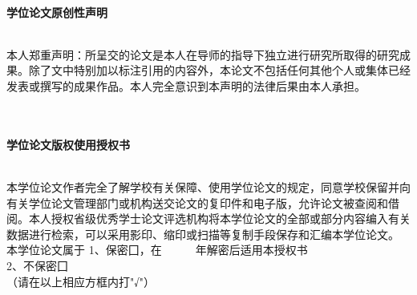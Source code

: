 \thispagestyle{empty}
\begin{center} 
~~\\
\vspace{1cm}
\xiaoerhao
\heiti
\textbf{学位论文原创性声明}\\
\end{center}
\song
\fontsize{12pt}{24pt}\selectfont
~~\\
\indent 本人郑重声明：所呈交的论文是本人在导师的指导下独立进行研究所取得的研究成果。除了文中特别加以标注引用的内容外，本论文不包括任何其他个人或集体已经发表或撰写的成果作品。本人完全意识到本声明的法律后果由本人承担。\\
~~\\

\begin{center}
~~\\
\vspace{1cm}
\xiaoerhao
\heiti
\textbf{学位论文版权使用授权书}\\
\end{center}
\song
\fontsize{12pt}{24pt}\selectfont
~~\\
\indent 本学位论文作者完全了解学校有关保障、使用学位论文的规定，同意学校保留并向有关学位论文管理部门或机构送交论文的复印件和电子版，允许论文被查阅和借阅。本人授权省级优秀学士论文评选机构将本学位论文的全部或部分内容编入有关数据进行检索，可以采用影印、缩印或扫描等复制手段保存和汇编本学位论文。\\
\indent 本学位论文属于 1、保密囗，在~~~~~~年解密后适用本授权书\\
\indent \phantom{aaaaaaaaaaaaaaa}2、不保密囗\\
\indent \phantom{aaaaaaaaaaaaaaa}（请在以上相应方框内打"√"）
~~\\
\newpage